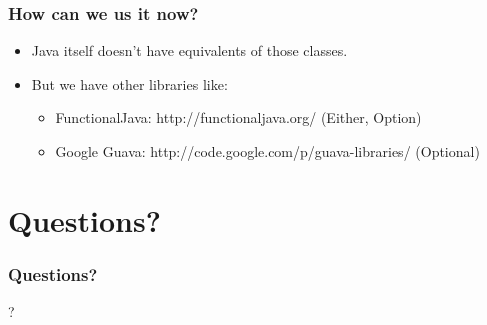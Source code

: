 \documentclass[xcolor=dvipsnames]{beamer}
\begin{document}
\begin{frame}
\frametitle{How can we us it now?}
\begin{itemize}
\item Java itself doesn't have equivalents of those classes.
\item But we have other libraries like:
	\begin{itemize}
	\item FunctionalJava: http://functionaljava.org/ (Either, Option)
	\item Google Guava: http://code.google.com/p/guava-libraries/ (Optional)
	\end{itemize}
\end{itemize}
\end{frame}

\section{Questions?}

\begin{frame}
\frametitle{Questions?}
\begin{center}
\Huge{?}
\end{center}
\end{frame}
\end{document}
